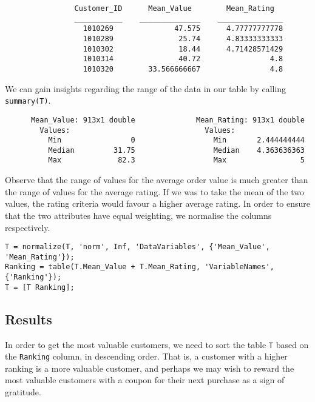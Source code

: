 \begin{lstlisting}
                Customer_ID      Mean_Value        Mean_Rating   
                ___________    ______________    _______________
                  1010269              47.575      4.77777777778
                  1010289               25.74      4.83333333333
                  1010302               18.44      4.71428571429
                  1010314               40.72                4.8
                  1010320        33.566666667                4.8  
\end{lstlisting}

\noindent
We can gain insights regarding the range of the data in our table by calling \lstinline|summary(T)|.

\begin{lstlisting}
      Mean_Value: 913x1 double              Mean_Rating: 913x1 double            
        Values:                               Values:            
          Min                0                  Min       2.444444444                
          Median         31.75                  Median    4.363636363                
          Max             82.3                  Max                 5    
\end{lstlisting}

\noindent
Observe that the range of values for the average order value is much greater than the range of values for the average rating. If we was to take the mean of the two values, the rating criteria would favour a higher average rating. In order to ensure that the two attributes have equal weighting, we normalise the columns respectively.

\begin{lstlisting}
T = normalize(T, 'norm', Inf, 'DataVariables', {'Mean_Value', 'Mean_Rating'});
Ranking = table(T.Mean_Value + T.Mean_Rating, 'VariableNames', {'Ranking'});
T = [T Ranking];
\end{lstlisting}

\subsection{Results}

In order to get the most valuable customers, we need to sort the table \lstinline|T| based on the \lstinline|Ranking| column, in descending order. That is, a customer with a higher ranking is a more valuable customer, and perhaps we may wish to reward the most valuable customers with a coupon for their next purchase as a sign of gratitude.

